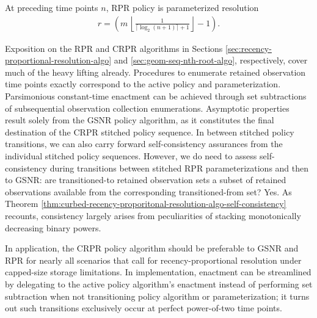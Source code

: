 At preceding time points $n$, RPR policy is parameterized resolution
\begin{align*}
r = \left(
  m \,
  \left\lfloor
  \frac{1}{\lceil \log_2(n + 1) \rceil + 1}
  \right\rfloor
  - 1
\right).
\end{align*}

Exposition on the RPR and CRPR algorithms in Sections \ref{sec:recency-proportional-resolution-algo} and \ref{sec:geom-seq-nth-root-algo}, respectively, cover much of the heavy lifting already.
Procedures to enumerate retained observation time points exactly correspond to the active policy and parameterization.
Parsimonious constant-time enactment can be achieved through set subtractions of subsequential observation collection enumerations.
Asymptotic properties result solely from the GSNR policy algorithm, as it constitutes the final destination of the CRPR stitched policy sequence.
In between stitched policy transitions, we can also carry forward self-consistency assurances from the individual stitched policy sequences.
However, we do need to assess self-consistency during transitions between stitched RPR parameterizations and then to GSNR: are transitioned-to retained observation sets a subset of retained observations available from the corresponding transitioned-from set?
Yes.
As Theorem \ref{thm:curbed-recency-proporitonal-resolution-algo-self-consistency} recounts, consistency largely arises from peculiarities of stacking monotonically decreasing binary powers.

In application, the CRPR policy algorithm should be preferable to GSNR and RPR for nearly all scenarios that call for recency-proportional resolution under capped-size storage limitations.
In implementation, enactment can be streamlined by delegating to the active policy algorithm's enactment instead of performing set subtraction when not transitioning policy algorithm or parameterization; it turns out such transitions exclusively occur at perfect power-of-two time points.



